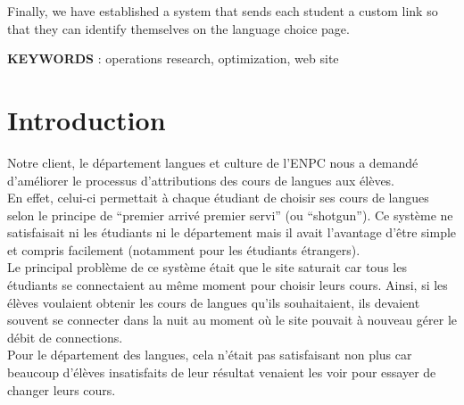 \documentclass[12pt]{article}
\begin{document}
\begin{center}
\begin{minipage}{16cm}
{{         
        Finally, we have established a system that sends each student a custom link so that they can identify themselves on the language choice page. \\
        }
				\par}
		\end{minipage}
		
		\vspace{1cm}
		
		\begin{minipage}{16cm}
			{\normalsize
				\parindent=0pt
				{{\bf KEYWORDS} : operations research, optimization, web site }
				\par}
		\end{minipage}
		
	\end{center}
	
		\newpage
		\tableofcontents
		\newpage
		\listoftables
		\newpage
		\listoffigures
		\newpage
		\listofappendices
	    \newpage
	
	\section{Introduction}
	
  Notre client, le département langues et culture de l’ENPC nous a demandé d’améliorer le processus d’attributions des cours de langues aux élèves.  \\
  
  En effet, celui-ci permettait à chaque étudiant de choisir ses cours de langues selon le principe de “premier arrivé premier servi” (ou “shotgun”). Ce système ne satisfaisait ni les étudiants ni le département mais il avait l’avantage d’être simple et compris facilement (notamment pour les étudiants étrangers). \\
  
  Le principal problème de ce système était que le site saturait car tous les étudiants se connectaient au même moment pour choisir leurs cours. Ainsi, si les élèves voulaient obtenir les cours de langues qu’ils souhaitaient, ils devaient souvent se connecter dans la nuit au moment où le site pouvait à nouveau gérer le débit de connections. \\
  
  Pour le département des langues, cela n’était pas satisfaisant non plus car beaucoup d’élèves insatisfaits de leur résultat venaient les voir pour essayer de changer leurs cours. \\
  
\end{document}
